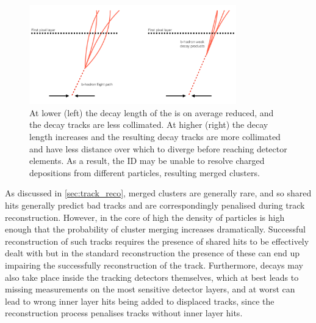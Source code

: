 \begin{figure}[!htbp]
  \centering
  \includegraphics[width=0.8\textwidth]{chapters/3.tracking/figs/high_pt_b_decay.pdf}
  \caption{
    At lower \pt (left) the decay length of the \bhadron is on average reduced, and the decay tracks are less collimated.
    At higher \pt (right) the \bhadron decay length increases and the resulting decay tracks are more collimated and have less distance over which to diverge before reaching detector elements.
    As a result, the ID may be unable to resolve charged depositions from different particles, resulting merged clusters.
  }
  \label{fig:high_pt_b_decay}
\end{figure}

As discussed in \cref{sec:track_reco}, merged clusters are generally rare, and so shared hits generally predict bad tracks and are correspondingly penalised during track reconstruction.
However, in the core of high \pT \bjets the density of particles is high enough that the probability of cluster merging increases dramatically.
Successful reconstruction of such tracks requires the presence of shared hits to be effectively dealt with but in the standard reconstruction the presence of these can end up impairing the successfully reconstruction of the track.
Furthermore, decays may also take place inside the tracking detectors themselves, which at best leads to missing measurements on the most sensitive detector layers, and at worst can lead to wrong inner layer hits being added to displaced tracks, since the reconstruction process penalises tracks without inner layer hits.





